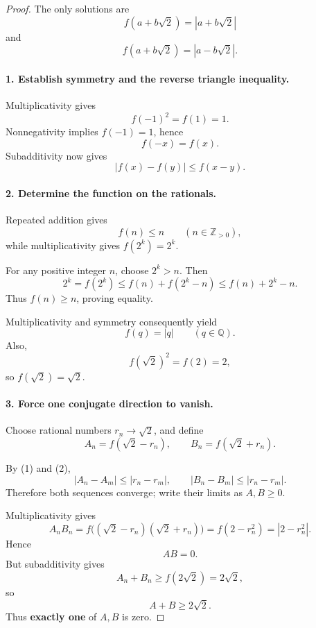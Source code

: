 
\begin{dlsummary}[title={\bfseries Solution 64. The Invisible Conjugate},breakable]

\begin{proof}
The only solutions are
\[
\boxed{f(a+b\sqrt2)=|a+b\sqrt2|}
\]
and
\[
\boxed{f(a+b\sqrt2)=|a-b\sqrt2|.}
\]

\paragraph{1. Establish symmetry and the reverse triangle inequality.}

Multiplicativity gives
\[
f(-1)^2=f(1)=1.
\]
Nonnegativity implies \(f(-1)=1\), hence
\[
f(-x)=f(x).
\]
Subadditivity now gives
\[
\boxed{|f(x)-f(y)|\le f(x-y).} \tag{1}
\]

\paragraph{2. Determine the function on the rationals.}

Repeated addition gives
\[
f(n)\le n\qquad(n\in\mathbb Z_{>0}),
\]
while multiplicativity gives \(f(2^k)=2^k\).

For any positive integer \(n\), choose \(2^k>n\). Then
\[
2^k=f(2^k)
\le f(n)+f(2^k-n)
\le f(n)+2^k-n.
\]
Thus \(f(n)\ge n\), proving equality.

Multiplicativity and symmetry consequently yield
\[
\boxed{f(q)=|q|\qquad(q\in\mathbb Q).} \tag{2}
\]
Also,
\[
f(\sqrt2)^2=f(2)=2,
\]
so \(f(\sqrt2)=\sqrt2\).

\paragraph{3. Force one conjugate direction to vanish.}

Choose rational numbers \(r_n\to\sqrt2\), and define
\[
A_n=f(\sqrt2-r_n),\qquad
B_n=f(\sqrt2+r_n).
\]

By (1) and (2),
\[
|A_n-A_m|\le|r_n-r_m|,
\qquad
|B_n-B_m|\le|r_n-r_m|.
\]
Therefore both sequences converge; write their limits as \(A,B\ge0\).

Multiplicativity gives
\[
A_nB_n
=f\bigl((\sqrt2-r_n)(\sqrt2+r_n)\bigr)
=f(2-r_n^2)
=|2-r_n^2|.
\]
Hence
\[
AB=0.
\]
But subadditivity gives
\[
A_n+B_n\ge f(2\sqrt2)=2\sqrt2,
\]
so
\[
A+B\ge2\sqrt2.
\]
Thus \textbf{exactly one} of \(A,B\) is zero.


\end{proof}
\end{dlsummary}
